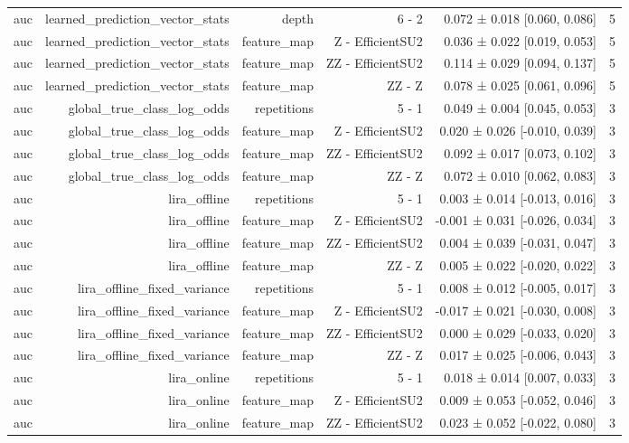 \begin{table}
\begin{tabular}{lrrrrr}
auc & learned\_prediction\_vector\_stats & depth & 6 - 2 & 0.072 ± 0.018 [0.060, 0.086] & 5 \\
auc & learned\_prediction\_vector\_stats & feature\_map & Z - EfficientSU2 & 0.036 ± 0.022 [0.019, 0.053] & 5 \\
auc & learned\_prediction\_vector\_stats & feature\_map & ZZ - EfficientSU2 & 0.114 ± 0.029 [0.094, 0.137] & 5 \\
auc & learned\_prediction\_vector\_stats & feature\_map & ZZ - Z & 0.078 ± 0.025 [0.061, 0.096] & 5 \\
auc & global\_true\_class\_log\_odds & repetitions & 5 - 1 & 0.049 ± 0.004 [0.045, 0.053] & 3 \\
auc & global\_true\_class\_log\_odds & feature\_map & Z - EfficientSU2 & 0.020 ± 0.026 [-0.010, 0.039] & 3 \\
auc & global\_true\_class\_log\_odds & feature\_map & ZZ - EfficientSU2 & 0.092 ± 0.017 [0.073, 0.102] & 3 \\
auc & global\_true\_class\_log\_odds & feature\_map & ZZ - Z & 0.072 ± 0.010 [0.062, 0.083] & 3 \\
auc & lira\_offline & repetitions & 5 - 1 & 0.003 ± 0.014 [-0.013, 0.016] & 3 \\
auc & lira\_offline & feature\_map & Z - EfficientSU2 & -0.001 ± 0.031 [-0.026, 0.034] & 3 \\
auc & lira\_offline & feature\_map & ZZ - EfficientSU2 & 0.004 ± 0.039 [-0.031, 0.047] & 3 \\
auc & lira\_offline & feature\_map & ZZ - Z & 0.005 ± 0.022 [-0.020, 0.022] & 3 \\
auc & lira\_offline\_fixed\_variance & repetitions & 5 - 1 & 0.008 ± 0.012 [-0.005, 0.017] & 3 \\
auc & lira\_offline\_fixed\_variance & feature\_map & Z - EfficientSU2 & -0.017 ± 0.021 [-0.030, 0.008] & 3 \\
auc & lira\_offline\_fixed\_variance & feature\_map & ZZ - EfficientSU2 & 0.000 ± 0.029 [-0.033, 0.020] & 3 \\
auc & lira\_offline\_fixed\_variance & feature\_map & ZZ - Z & 0.017 ± 0.025 [-0.006, 0.043] & 3 \\
auc & lira\_online & repetitions & 5 - 1 & 0.018 ± 0.014 [0.007, 0.033] & 3 \\
auc & lira\_online & feature\_map & Z - EfficientSU2 & 0.009 ± 0.053 [-0.052, 0.046] & 3 \\
auc & lira\_online & feature\_map & ZZ - EfficientSU2 & 0.023 ± 0.052 [-0.022, 0.080] & 3 \\

\end{tabular}
\end{table}
